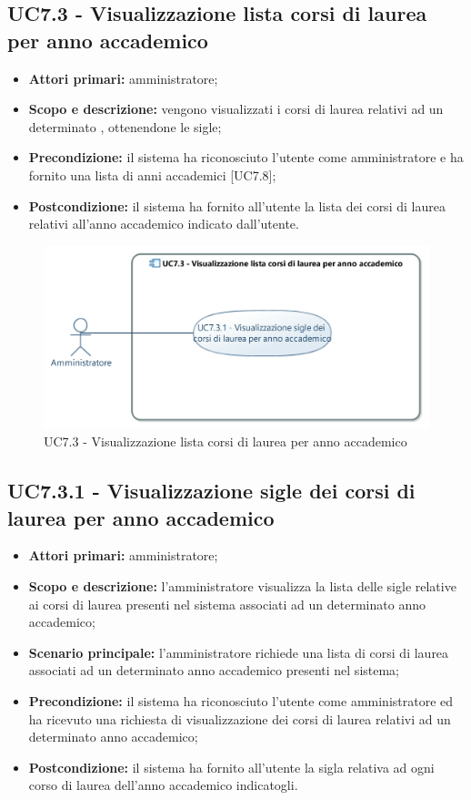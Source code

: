 \documentclass[AnalisiDeiRequisiti.tex]{subfiles}
\begin{document}
\subsection{UC7.3 - Visualizzazione lista corsi di laurea per anno accademico}
\begin{itemize}
	\item \textbf{Attori primari:} amministratore;
	\item \textbf{Scopo e descrizione:} vengono visualizzati i corsi di laurea relativi ad un determinato , ottenendone le sigle;
	\item \textbf{Precondizione:} il sistema ha riconosciuto l'utente come amministratore e ha fornito una lista di anni accademici [UC7.8];
	\item \textbf{Postcondizione:} il sistema ha fornito all'utente la lista dei corsi di laurea relativi all'anno accademico indicato dall'utente.
\end{itemize}
\begin{figure}[H]
	\centering
	\includegraphics[width=0.7\linewidth]{UC7_3.jpg}
	\caption{UC7.3 - Visualizzazione lista corsi di laurea per anno accademico}
	\label{fig:UC7.3 - Visualizzazione lista corsi di laurea per anno accademico}
\end{figure}
\subsection{UC7.3.1 - Visualizzazione sigle dei corsi di laurea per anno accademico}
\begin{itemize}
	\item \textbf{Attori primari:} amministratore;
	\item \textbf{Scopo e descrizione:} l'amministratore visualizza la lista delle sigle relative ai corsi di laurea presenti nel sistema associati ad un determinato anno accademico;
	\item \textbf{Scenario principale:} l'amministratore richiede una lista di corsi di laurea associati ad un determinato anno accademico presenti nel sistema;
	\item \textbf{Precondizione:} il sistema ha riconosciuto l'utente come amministratore ed ha ricevuto una richiesta di visualizzazione dei corsi di laurea relativi ad un determinato anno accademico; 
	\item \textbf{Postcondizione:} il sistema ha fornito all'utente la sigla relativa ad ogni corso di laurea dell'anno accademico indicatogli.
\end{itemize}
\end{document}

